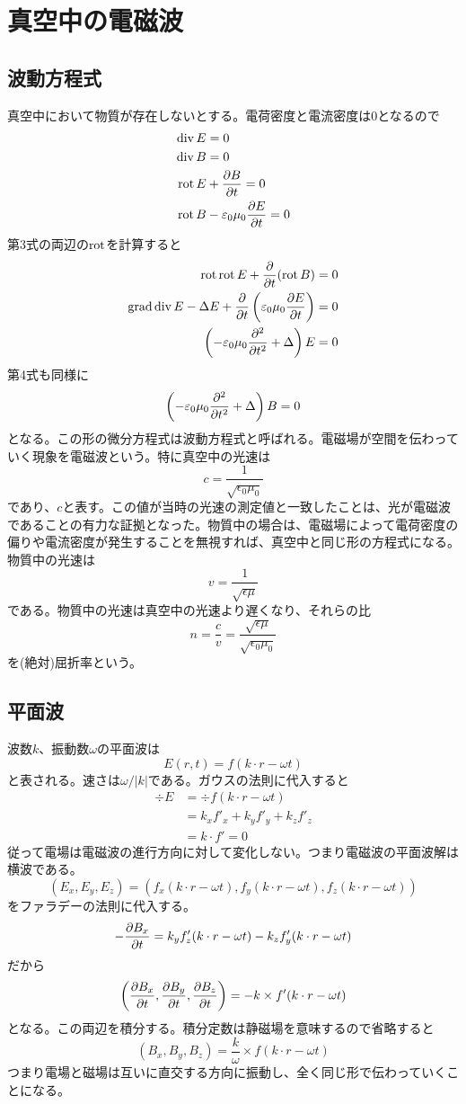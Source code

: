 \section{真空中の電磁波}

\subsection{波動方程式}
    真空中において物質が存在しないとする。電荷密度と電流密度は0となるので
    \begin{align*}
        \div E &= 0\\
        \div B &= 0\\
        \rot E &+ \pd[B]{t} = 0\\
        \rot B &- \epsilon_0\mu_0\pd[E]{t} = 0
    \end{align*}
    第3式の両辺の$\rot$を計算すると
    \begin{align*}
        \rot\rot E + \pd{t}(\rot B) &= 0\\
        \grad\div E - \Delta E + \pd{t}\left(\epsilon_0\mu_0\pd[E]{t}\right) &= 0\\
        \left(-\epsilon_0\mu_0\pdv[2]{t} + \Delta\right)E &= 0
    \end{align*}
    第4式も同様に
        \[\left(-\epsilon_0\mu_0\pdv[2]{t} + \Delta\right)B = 0\]
    となる。この形の微分方程式は波動方程式と呼ばれる。電磁場が空間を伝わっていく現象を電磁波という。特に真空中の光速は
        \[c = \frac{1}{\sqrt{\epsilon_0\mu_0}}\]
    であり、$c$と表す。この値が当時の光速の測定値と一致したことは、光が電磁波であることの有力な証拠となった。物質中の場合は、電磁場によって電荷密度の偏りや電流密度が発生することを無視すれば、真空中と同じ形の方程式になる。物質中の光速は
        \[v = \frac{1}{\sqrt{\epsilon\mu}}\]
    である。物質中の光速は真空中の光速より遅くなり、それらの比
        \[n = \frac{c}{v} = \frac{\sqrt{\epsilon\mu}}{\sqrt{\epsilon_0\mu_0}}\]
    を(絶対)屈折率という。

\subsection{平面波}
    波数$k$、振動数$\omega$の平面波は
        \[E(r, t) = f(k \cdot r - \omega t)\]
    と表される。速さは$\omega / |k|$である。ガウスの法則に代入すると
    \begin{align*}
        \div E
        &= \div f(k \cdot r - \omega t)\\
        &= k_xf'_x + k_yf'_y + k_zf'_z\\
        &= k \cdot f' = 0
    \end{align*}
    従って電場は電磁波の進行方向に対して変化しない。つまり電磁波の平面波解は横波である。
        \[(E_x, E_y, E_z) = (f_x(k \cdot r - \omega t), f_y(k \cdot r - \omega t), f_z(k \cdot r - \omega t))\]
    をファラデーの法則に代入する。
        \[-\pd[B_x]{t} = k_yf_z'(k \cdot r - \omega t) - k_zf_y'(k \cdot r - \omega t)\]
    だから
        \[\left(\pd[B_x]{t}, \pd[B_y]{t}, \pd[B_z]{t}\right) = -k \times f'(k \cdot r - \omega t)\]
    となる。この両辺を積分する。積分定数は静磁場を意味するので省略すると
        \[(B_x, B_y, B_z) = \frac{k}{\omega} \times f(k \cdot r - \omega t)\]
    つまり電場と磁場は互いに直交する方向に振動し、全く同じ形で伝わっていくことになる。


